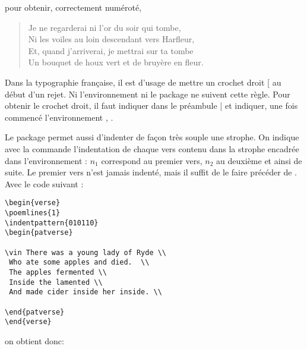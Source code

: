 pour obtenir, correctement numéroté, 

\begin{verse}


Je ne regarderai ni l'or du soir qui tombe,\\
Ni les voiles au loin descendant vers Harfleur,\\
Et, quand j'arriverai, je mettrai sur ta tombe\\
Un bouquet de houx vert et de bruyère en fleur.\\

\end{verse}

\begin{anedocte}
Dans la typographie française, il est d'usage de mettre un crochet droit [ au début d'un rejet. Ni l'environnement ni le package  ne suivent cette règle. Pour obtenir le crochet droit, il faut indiquer dans le préambule | et indiquer, une fois commencé l'environnement , .
\end{anedocte}

Le package  permet aussi d'indenter de façon très souple une strophe. On indique avec la commande  l'indentation de chaque vers contenu dans la strophe encadrée dans l'environnement : $n_1$ correspond au premier vers, $n_2$ au deuxième et ainsi de suite. Le premier vers n'est jamais indenté, mais il suffit de le faire précéder de . Avec le code suivant :

\begin{verbatim}
\begin{verse} 
\poemlines{1}
\indentpattern{010110} 
\begin{patverse} 

\vin There was a young lady of Ryde \\
 Who ate some apples and died.  \\
 The apples fermented \\
 Inside the lamented \\
 And made cider inside her inside. \\

\end{patverse}  
\end{verse}
\end{verbatim}

on obtient donc:
  
